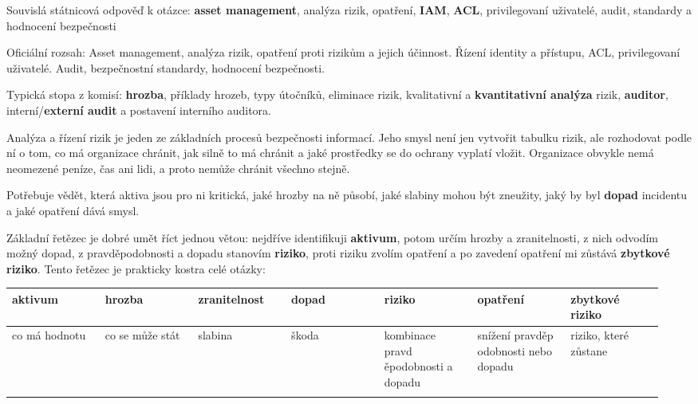 \iffalse

Souvislá státnicová odpověď k otázce: \textbf{asset management}, analýza rizik, opatření, \textbf{IAM}, \textbf{ACL}, privilegovaní uživatelé, audit, standardy a hodnocení bezpečnosti


Oficiální rozsah: Asset management, analýza rizik, opatření proti rizikům a jejich účinnost. Řízení identity a přístupu, ACL, privilegovaní uživatelé. Audit, bezpečnostní standardy, hodnocení bezpečnosti.

Typická stopa z komisí: \textbf{hrozba}, příklady hrozeb, typy útočníků, eliminace rizik, kvalitativní a \textbf{kvantitativní analýza} rizik, \textbf{auditor}, interní/\textbf{externí audit} a postavení interního auditora.

Analýza a řízení rizik je jeden ze základních procesů bezpečnosti informací. Jeho smysl není jen vytvořit tabulku rizik, ale rozhodovat podle ní o tom, co má organizace chránit, jak silně to má chránit a jaké prostředky se do ochrany vyplatí vložit. Organizace obvykle nemá neomezené peníze, čas ani lidi, a proto nemůže chránit všechno stejně.

Potřebuje vědět, která aktiva jsou pro ni kritická, jaké hrozby na ně působí, jaké slabiny mohou být zneužity, jaký by byl \textbf{dopad} incidentu a jaké opatření dává smysl.

Základní řetězec je dobré umět říct jednou větou: nejdříve identifikuji \textbf{aktivum}, potom určím hrozby a zranitelnosti, z nich odvodím možný dopad, z pravděpodobnosti a dopadu stanovím \textbf{riziko}, proti riziku zvolím opatření a po zavedení opatření mi zůstává \textbf{zbytkové riziko}. Tento řetězec je prakticky kostra celé otázky:

\begin{longtable}{p{0.136\linewidth}p{0.136\linewidth}p{0.136\linewidth}p{0.136\linewidth}p{0.136\linewidth}p{0.136\linewidth}p{0.136\linewidth}}
\toprule
\textbf{aktivum} & \textbf{hrozba} & \textbf{zranitelnost} & \textbf{dopad} & \textbf{riziko} & \textbf{opatření} & \textbf{zbytkové riziko} \\
\midrule\endhead
co má hodnotu & co se může stát & slabina & škoda & kombinace pravd ěpodobnosti a dopadu & snížení pravděp odobnosti nebo dopadu & riziko, které zůstane \\
\addlinespace
\bottomrule
\end{longtable}

